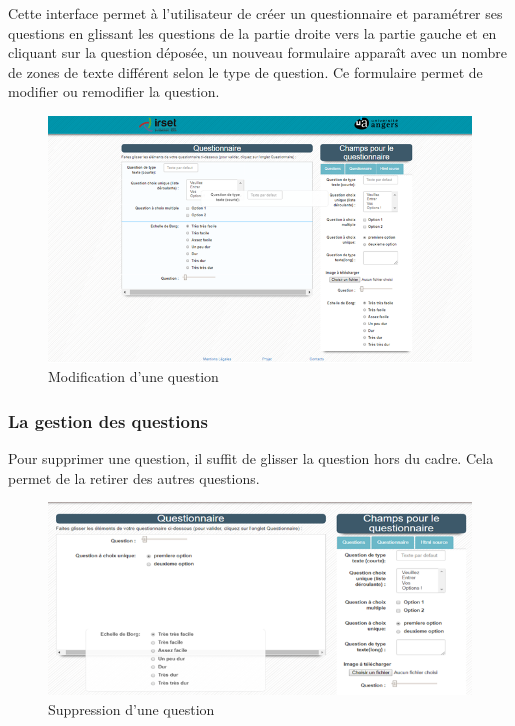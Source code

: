 Cette interface permet à l'utilisateur de créer un questionnaire et paramétrer ses questions en glissant les questions de la partie droite vers la partie gauche et en cliquant sur la question déposée, un nouveau formulaire apparaît avec un nombre de zones de texte différent selon le type de question. Ce formulaire permet de modifier ou remodifier la question.


\begin{figure}[H]
    \begin{center}
	\includegraphics[scale=0.8]{img/questionnaire/generateur}
    \end{center}
    \caption{Modification d'une question}
\end{figure}
 
 
\subsubsection{La gestion des questions}

Pour supprimer une question, il suffit de glisser la question hors du cadre. Cela permet de la retirer des autres questions.


\begin{figure}[H]
    \begin{center}
	\includegraphics[scale=0.8]{img/questionnaire/suppresion}
    \end{center}
    \caption{Suppression d'une question}
\end{figure}


